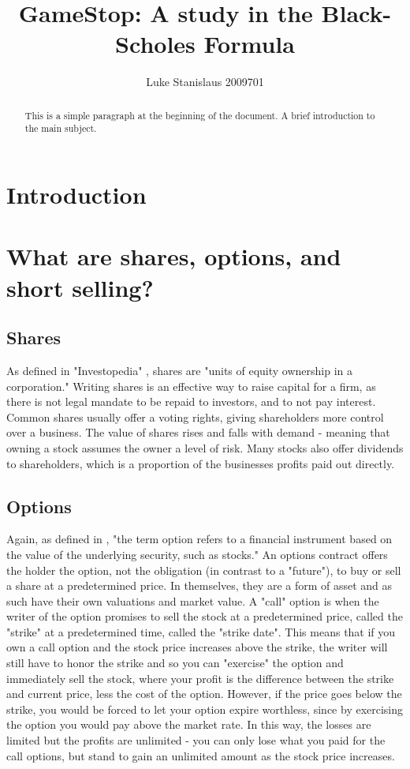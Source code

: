 \documentclass[11pt]{article} %
\title{GameStop: A study in the Black-Scholes Formula}
\author{Luke Stanislaus 2009701}
\begin{document}
\maketitle

\begin{abstract}
    This is a simple paragraph at the beginning of the document. A brief introduction to the main subject.
    \end{abstract}

\section{Introduction}


\section{What are shares, options, and short selling?}
\subsection{Shares}
As defined in "Investopedia" \cite{shares}, shares are "units of equity 
ownership in a corporation." Writing shares is an effective way to raise 
capital for a firm, as there is not legal mandate to be repaid to 
investors, and to not pay interest. Common shares usually offer a voting 
rights, giving shareholders more control over a business. The value of 
shares rises and falls with demand - meaning that owning a stock assumes 
the owner a level of risk. Many stocks also offer dividends to 
shareholders, which is a proportion of the businesses profits paid out 
directly.
\subsection{Options}
Again, as defined in \cite{options}, "the term option refers to a 
financial instrument based on the value of the underlying security, 
such as stocks." An options contract offers the holder the option, 
not the obligation (in contrast to a "future"), to buy or sell a share 
at a predetermined price. In themselves, they are a form of asset and 
as such have their own valuations and market value. A "call" option 
is when the writer of the option promises to sell the stock at a 
predetermined price, called the "strike" at a predetermined time, 
called the "strike date". This means that if you own a call option and 
the stock price increases above the strike, the writer will still have 
to honor the strike and so you can "exercise" the option 
and immediately sell the stock, where your profit is the difference 
between the strike and current price, less the cost of the option. 
However, if the price goes below the strike, you would be forced 
to let your option expire worthless, since by exercising the option 
you would pay above the market rate. In this way, the losses are limited 
but the profits are unlimited - you can only lose what you paid for the 
call options, but stand to gain an unlimited amount as the stock price 
increases. 
\end{document}
